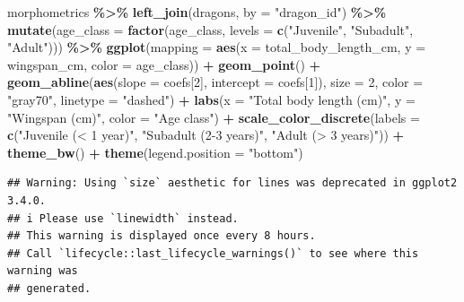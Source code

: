 \documentclass[
]{book}
\newenvironment{Shaded}{\begin{snugshade}}{\end{snugshade}}
\newcommand{\AttributeTok}[1]{\textcolor[rgb]{0.13,0.29,0.53}{#1}}
\newcommand{\DecValTok}[1]{\textcolor[rgb]{0.00,0.00,0.81}{#1}}
\newcommand{\FunctionTok}[1]{\textcolor[rgb]{0.13,0.29,0.53}{\textbf{#1}}}
\newcommand{\NormalTok}[1]{#1}
\newcommand{\SpecialCharTok}[1]{\textcolor[rgb]{0.81,0.36,0.00}{\textbf{#1}}}
\newcommand{\StringTok}[1]{\textcolor[rgb]{0.31,0.60,0.02}{#1}}
\begin{document}
\begin{Shaded}
\begin{Highlighting}[]
\NormalTok{morphometrics }\SpecialCharTok{\%\textgreater{}\%} 
  \FunctionTok{left\_join}\NormalTok{(dragons, }\AttributeTok{by =} \StringTok{"dragon\_id"}\NormalTok{) }\SpecialCharTok{\%\textgreater{}\%} 
  \FunctionTok{mutate}\NormalTok{(}\AttributeTok{age\_class =} \FunctionTok{factor}\NormalTok{(age\_class, }\AttributeTok{levels =} \FunctionTok{c}\NormalTok{(}\StringTok{"Juvenile"}\NormalTok{,}
                                                  \StringTok{"Subadult"}\NormalTok{,}
                                                  \StringTok{"Adult"}\NormalTok{))) }\SpecialCharTok{\%\textgreater{}\%} 
\FunctionTok{ggplot}\NormalTok{(}\AttributeTok{mapping =} \FunctionTok{aes}\NormalTok{(}\AttributeTok{x =}\NormalTok{ total\_body\_length\_cm, }\AttributeTok{y =}\NormalTok{ wingspan\_cm, }\AttributeTok{color =}\NormalTok{ age\_class)) }\SpecialCharTok{+}
  \FunctionTok{geom\_point}\NormalTok{() }\SpecialCharTok{+}
  \FunctionTok{geom\_abline}\NormalTok{(}\FunctionTok{aes}\NormalTok{(}\AttributeTok{slope =}\NormalTok{ coefs[}\DecValTok{2}\NormalTok{], }\AttributeTok{intercept =}\NormalTok{ coefs[}\DecValTok{1}\NormalTok{]), }
              \AttributeTok{size =} \DecValTok{2}\NormalTok{,}
              \AttributeTok{color =} \StringTok{"gray70"}\NormalTok{,}
              \AttributeTok{linetype =} \StringTok{"dashed"}\NormalTok{) }\SpecialCharTok{+} 
  \FunctionTok{labs}\NormalTok{(}\AttributeTok{x =} \StringTok{"Total body length (cm)"}\NormalTok{, }\AttributeTok{y =} \StringTok{"Wingspan (cm)"}\NormalTok{, }\AttributeTok{color =} \StringTok{"Age class"}\NormalTok{) }\SpecialCharTok{+}
  \FunctionTok{scale\_color\_discrete}\NormalTok{(}\AttributeTok{labels =} \FunctionTok{c}\NormalTok{(}\StringTok{"Juvenile (\textless{} 1 year)"}\NormalTok{,}
                                 \StringTok{"Subadult (2{-}3 years)"}\NormalTok{,}
                                 \StringTok{"Adult (\textgreater{} 3 years)"}\NormalTok{)) }\SpecialCharTok{+}
  \FunctionTok{theme\_bw}\NormalTok{() }\SpecialCharTok{+}
  \FunctionTok{theme}\NormalTok{(}\AttributeTok{legend.position =} \StringTok{"bottom"}\NormalTok{) }
\end{Highlighting}
\end{Shaded}

\begin{verbatim}
## Warning: Using `size` aesthetic for lines was deprecated in ggplot2 3.4.0.
## i Please use `linewidth` instead.
## This warning is displayed once every 8 hours.
## Call `lifecycle::last_lifecycle_warnings()` to see where this warning was
## generated.
\end{verbatim}
\end{document}
